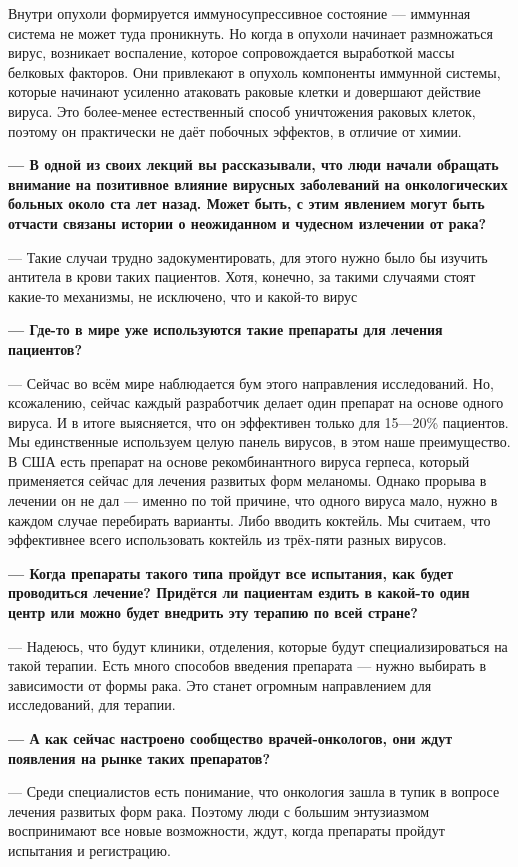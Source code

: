Внутри опухоли формируется иммуносупрессивное состояние --- иммунная система не может туда проникнуть. Но когда в опухоли начинает размножаться вирус, возникает воспаление, которое сопровождается выработкой массы белковых факторов. Они привлекают в опухоль компоненты иммунной системы, которые начинают усиленно атаковать раковые клетки и довершают действие вируса. Это более-менее естественный способ уничтожения раковых клеток, поэтому он практически не даёт побочных эффектов, в отличие от химии.

{\bf --- В одной из своих лекций вы рассказывали, что люди начали обращать внимание на позитивное влияние вирусных заболеваний на онкологических больных около ста лет назад. Может быть, с этим явлением могут быть отчасти связаны истории о неожиданном и чудесном излечении от рака? }

--- Такие случаи трудно задокументировать, для этого нужно было бы изучить антитела в крови таких пациентов. Хотя, конечно, за такими случаями стоят какие-то механизмы, не исключено, что и какой-то вирус

{\bf --- Где-то в мире уже используются такие препараты для лечения пациентов? }

--- Сейчас во всём мире наблюдается бум этого направления исследований. Но, ксожалению, сейчас каждый разработчик делает один препарат на основе одного вируса. И в итоге выясняется, что он эффективен только для 15---20\% пациентов. Мы единственные используем целую панель вирусов, в этом наше преимущество. В США есть препарат на основе рекомбинантного вируса герпеса, который применяется сейчас для лечения развитых форм меланомы. Однако прорыва в лечении он не дал --- именно по той причине, что одного вируса мало, нужно в каждом случае перебирать варианты. Либо вводить коктейль. Мы считаем, что эффективнее всего использовать коктейль из трёх-пяти разных вирусов.

{\bf --- Когда препараты такого типа пройдут все испытания, как будет проводиться лечение? Придётся ли пациентам ездить в какой-то один центр или можно будет внедрить эту терапию по всей стране?}

--- Надеюсь, что будут клиники, отделения, которые будут специализироваться на такой терапии. Есть много способов введения препарата --- нужно выбирать в зависимости от формы рака. Это станет огромным направлением для исследований, для терапии.

{\bf --- А как сейчас настроено сообщество врачей-онкологов, они ждут появления на рынке таких препаратов? }

--- Среди специалистов есть понимание, что онкология зашла в тупик в вопросе лечения развитых форм рака. Поэтому люди с большим энтузиазмом воспринимают все новые возможности, ждут, когда препараты пройдут испытания и регистрацию.


